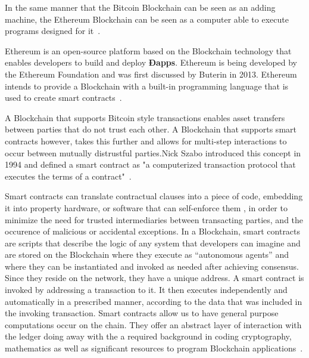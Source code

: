 In the same manner that the Bitcoin Blockchain can be seen as an adding
machine, the Ethereum Blockchain can be seen as a computer able to execute
programs designed for it~\cite{Wood2015}.

Ethereum is an open-source platform based on the Blockchain technology that
enables developers to build and deploy \textbf{Ðapps}. Ethereum is being
developed by the Ethereum Foundation and was first discussed by Buterin in
2013.  Ethereum intends to provide a Blockchain with a built-in programming
language that is used to create smart contracts~\cite{Wood2017}.

A Blockchain that supports Bitcoin style transactions enables asset transfers
between parties that do not trust each other. A Blockchain that supports smart
contracts however, takes this further and allows for multi-step interactions to
occur between mutually distrustful parties.Nick Szabo introduced this concept
in 1994 and defined a smart contract as "a computerized transaction protocol
that executes the terms of a contract"~\cite{Christidis2016}. 

Smart contracts can translate contractual clauses into a piece of code,
embedding it into property hardware, or software that can self-enforce them ,
in order to minimize the need for trusted intermediaries between transacting
parties, and the occurence of malicious or accidental exceptions. In a
Blockchain, smart contracts are scripts that describe the logic of any system
that developers can imagine and are stored on the Blockchain where they execute
as “autonomous agents” and where they can be instantiated and invoked as needed
after achieving consensus.  Since they reside on the network, they have a
unique address. A smart contract is invoked by addressing a transaction to it.
It then executes independently and automatically in a prescribed manner,
according to the data that was included in the invoking transaction. Smart
contracts allow us to have general purpose computations occur on the chain.
They offer an abstract layer of interaction with the ledger doing away with the
a required background in coding cryptography, mathematics as well as
significant resources to program Blockchain
applications~\cite{Wood2017,BlockGeeks2017}.

